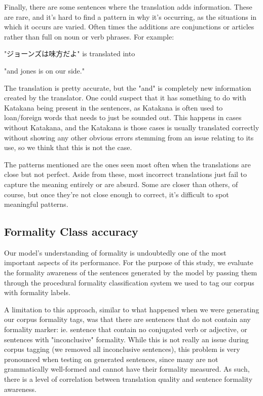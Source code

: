 \documentclass[11pt]{article}
\begin{document}
Finally, there are some sentences where the translation adds information. These are rare, and it's hard to find a pattern in why it's occurring, as the situations in which it occurs are varied. Often times the additions are conjunctions or articles rather than full on noun or verb phrases. For example: 

"ジョーンズは味方だよ" is translated into

"and jones is on our side."

The translation is pretty accurate, but the "and" is completely new information created by the translator. One could suspect that it has something to do with Katakana being present in the sentences, as Katakana is often used to loan/foreign words that needs to just be sounded out. This happens in cases without Katakana, and the Katakana is those cases is usually translated correctly without showing any other obvious errors stemming from an issue relating to its use, so we think that this is not the case. 

The patterns mentioned are the ones seen most often when the translations are close but not perfect. Aside from these, most incorrect translations just fail to capture the meaning entirely or are absurd. Some are closer than others, of course, but once they're not close enough to correct, it's difficult to spot meaningful patterns.

\subsection{Formality Class accuracy}

Our model's understanding of formality is undoubtedly one of the most important aspects of its performance. For the purpose of this study, we evaluate the formality awareness of the sentences generated by the model by passing them through the procedural formality classification system we used to tag our corpus with formality labels.

A limitation to this approach, similar to what happened when we were generating our corpus formality tags, was that there are sentences that do not contain any formality marker: ie. sentence that contain no conjugated verb or adjective, or sentences with "inconclusive" formality. While this is not really an issue during corpus tagging (we removed all inconclusive sentences), this problem is very pronounced when testing on generated sentences, since many are not grammatically well-formed and cannot have their formality measured. As such, there is a level of correlation between translation quality and sentence formality awareness.
\end{document}
